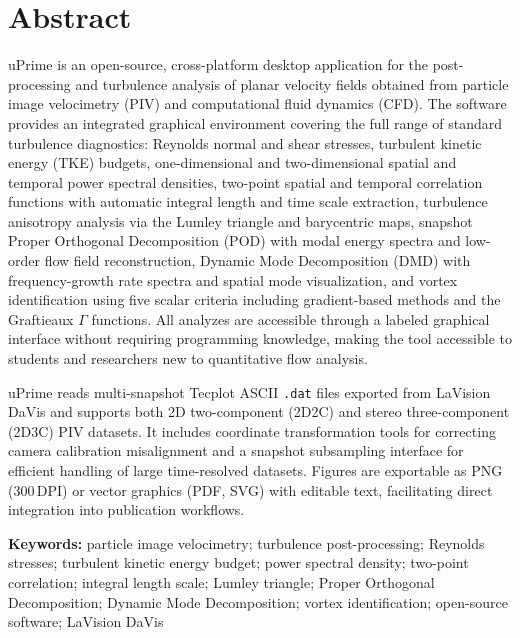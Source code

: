 \documentclass[11pt, a4paper]{report}
\newcommand{\software}[1]{\textsf{#1}}
\begin{document}
\begin{titlepage}
\vspace{0.4cm}
\noindent\colorbox{upblue}{\rule{0pt}{5pt}\hspace{\dimexpr\textwidth+2\fboxsep\relax}}
\end{titlepage}

\clearpage
\thispagestyle{empty}

\section*{Abstract}

\software{uPrime} is an open-source, cross-platform desktop application for the post-processing and turbulence analysis of planar velocity fields obtained from particle image velocimetry (PIV) and computational fluid dynamics (CFD). The software provides an integrated graphical environment covering the full range of standard turbulence diagnostics: Reynolds normal and shear stresses, turbulent kinetic energy (TKE) budgets, one-dimensional and two-dimensional spatial and temporal power spectral densities, two-point spatial and temporal correlation functions with automatic integral length and time scale extraction, turbulence anisotropy analysis via the Lumley triangle and barycentric maps, snapshot Proper Orthogonal Decomposition (POD) with modal energy spectra and low-order flow field reconstruction, Dynamic Mode Decomposition (DMD) with frequency-growth rate spectra and spatial mode visualization, and vortex identification using five scalar criteria including gradient-based methods and the Graftieaux $\Gamma$ functions. All analyzes are accessible through a labeled graphical interface without requiring programming knowledge, making the tool accessible to students and researchers new to quantitative flow analysis.

\software{uPrime} reads multi-snapshot Tecplot ASCII \texttt{.dat} files exported from LaVision DaVis and supports both 2D two-component (2D2C) and stereo three-component (2D3C) PIV datasets. It includes coordinate transformation tools for correcting camera calibration misalignment and a snapshot subsampling interface for efficient handling of large time-resolved datasets. Figures are exportable as PNG (300\,DPI) or vector graphics (PDF, SVG) with editable text, facilitating direct integration into publication workflows.

\vspace{0.5cm}
\noindent\textbf{Keywords:} particle image velocimetry; turbulence post-processing; Reynolds stresses; turbulent kinetic energy budget; power spectral density; two-point correlation; integral length scale; Lumley triangle; Proper Orthogonal Decomposition; Dynamic Mode Decomposition; vortex identification; open-source software; LaVision DaVis
\end{document}

